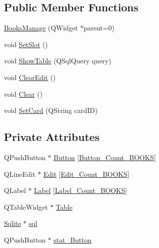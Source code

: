 \subsection*{Public Member Functions}
\begin{DoxyCompactItemize}
\item 
\mbox{\hyperlink{class_books_manage_adc44f2312ab4d2cd48868ff923fa8861}{Books\+Manage}} (Q\+Widget $\ast$parent=0)
\item 
void \mbox{\hyperlink{class_books_manage_a0ee0a3e432c7789497c17758d1f82fdf}{Set\+Slot}} ()
\item 
void \mbox{\hyperlink{class_books_manage_abbacf5e112bdee769aaa4d22c0e14744}{Show\+Table}} (Q\+Sql\+Query query)
\item 
void \mbox{\hyperlink{class_books_manage_aa5b813a7fb68aa61a143f84c87699c83}{Clear\+Edit}} ()
\item 
void \mbox{\hyperlink{class_books_manage_a8388b6b8547cc759a9976c1a567aab0a}{Clear}} ()
\item 
void \mbox{\hyperlink{class_books_manage_a009c231a6f8976be927b7acfdc4d4591}{Set\+Card}} (Q\+String card\+ID)
\end{DoxyCompactItemize}
\subsection*{Private Attributes}
\begin{DoxyCompactItemize}
\item 
Q\+Push\+Button $\ast$ \mbox{\hyperlink{class_books_manage_ad6d2668953bb202a37237227a97945b6}{Button}} \mbox{[}\mbox{\hyperlink{booksmanage_8h_a1f031c616a6edfa38e89dfb16a4f5a5e}{Button\+\_\+\+Count\+\_\+\+B\+O\+O\+KS}}\mbox{]}
\item 
Q\+Line\+Edit $\ast$ \mbox{\hyperlink{class_books_manage_aac41c654721ef320dd30c96cd7d5ec6c}{Edit}} \mbox{[}\mbox{\hyperlink{booksmanage_8h_a37e6a98d7cb44866bfdff08467fbbab1}{Edit\+\_\+\+Count\+\_\+\+B\+O\+O\+KS}}\mbox{]}
\item 
Q\+Label $\ast$ \mbox{\hyperlink{class_books_manage_ae5229988ac3199d79f55e0fd96439bd3}{Label}} \mbox{[}\mbox{\hyperlink{booksmanage_8h_a575ef603f6be7bd11518983b660df624}{Label\+\_\+\+Count\+\_\+\+B\+O\+O\+KS}}\mbox{]}
\item 
Q\+Table\+Widget $\ast$ \mbox{\hyperlink{class_books_manage_a0c82c7e6c92bc699d5f59af1e8a81d7a}{Table}}
\item 
\mbox{\hyperlink{class_sqlite}{Sqlite}} $\ast$ \mbox{\hyperlink{class_books_manage_a081e78f1eccbf607c3874a6c8c714983}{sql}}
\item 
Q\+Push\+Button $\ast$ \mbox{\hyperlink{class_books_manage_ab20d4d4f5d41c878f839c313764d66a5}{stat\+\_\+\+Button}}
\end{DoxyCompactItemize}


